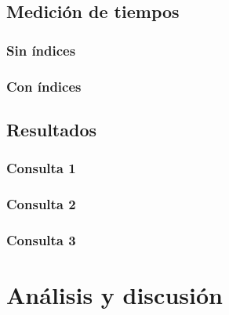 \subsection{Medición de tiempos}
\subsubsection{Sin índices}
\subsubsection{Con índices}
\subsection{Resultados}
\subsubsection{Consulta 1}
\subsubsection{Consulta 2}
\subsubsection{Consulta 3}
\section{Análisis y discusión}
